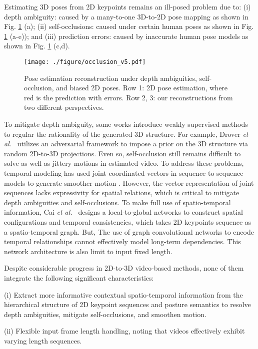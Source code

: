 \documentclass[letterpaper, 10 pt, conference, twoside]{ieeeconf}
\newcommand{\et}{{\em et al.\ }}
\begin{document}
Estimating 3D poses from 2D keypoints remains an ill-posed problem due to: (i) depth ambiguity: caused by a many-to-one 3D-to-2D pose mapping as shown in Fig. \ref{fig:occlusion} (a); (ii) self-occlusions: caused under certain human poses as shown in Fig. \ref{fig:occlusion} (a-e)); and (iii) prediction errors: caused by inaccurate human pose models as shown in Fig. \ref{fig:occlusion} (c,d).
\begin{figure}[t]
	\centering
	\texttt{[image: ./figure/occlusion\_v5.pdf]}
	\caption{Pose estimation reconstruction under depth ambiguities, self-occlusion, and biased 2D poses. Row 1: 2D pose estimation, where red is the prediction with errors. Row 2, 3: our reconstructions from two different perspectives. 
} \label{fig:occlusion}
\end{figure}


To mitigate depth ambiguity, some works \cite{drover2018can, wandt2019repnet} introduce weakly supervised methods to regular the rationality of the generated 3D structure. For example, Drover \et \cite{drover2018can} utilizes an adversarial framework to impose a prior on the 3D structure via random 2D-to-3D projections. Even so, self-occlusion still remains difficult to solve as well as jittery motions in estimated video.
To address these problems, temporal modeling has used joint-coordinated vectors in sequence-to-sequence models to generate smoother motion \cite{rayat2018exploiting,pavllo20193d}. However, the vector representation of joint sequences lacks expressivity for spatial relations, which is critical to mitigate depth ambiguities and self-occlusions.
To make full use of  spatio-temporal information, Cai \et \cite{cai2019exploiting} designs a local-to-global networks to construct spatial configurations and temporal consistencies, which takes 2D keypoints sequence as a spatio-temporal graph. But, The use of graph convolutional networks to encode temporal relationships cannot effectively model long-term dependencies. This network architecture is also limit to input fixed length.


Despite considerable progress in 2D-to-3D video-based methods, none of them integrate the following significant characteristics:

(i) Extract more informative contextual spatio-temporal information from the hierarchical structure of 2D keypoint sequences and posture semantics to resolve depth ambiguities, mitigate self-occlusions, and smoothen motion.

(ii) Flexible input frame length handling, noting that videos effectively exhibit varying length sequences.
\end{document}
